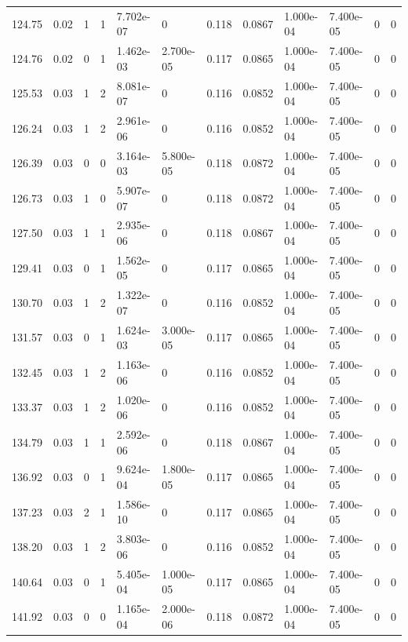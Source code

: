 \documentclass[preview]{standalone}
\begin{document}
{{{{\begin{tabular}{L{1.2cm}C{1.2cm} C{0.3cm}C{0.5cm} C{1.4cm}C{1.4cm} C{1.4cm}C{1.4cm} C{1.6cm}C{1.6cm} C{1.6cm}C{1.6cm}}
  124.75  &  0.02  & 1     &  1 &  7.702e-07  & 0  &  0.118&   0.0867& 1.000e-04 & 7.400e-05   &  0 & 0  \\ 
  124.76  &  0.02  & 0     &  1 &  1.462e-03  & 2.700e-05  &  0.117&   0.0865& 1.000e-04 & 7.400e-05   &  0 & 0  \\ 
  125.53  &  0.03  & 1     &  2 &  8.081e-07  & 0  &  0.116&   0.0852& 1.000e-04 & 7.400e-05   &  0 & 0  \\ 
  126.24  &  0.03  & 1     &  2 &  2.961e-06  & 0  &  0.116&   0.0852& 1.000e-04 & 7.400e-05   &  0 & 0  \\ 
  126.39  &  0.03  & 0     &  0 &  3.164e-03  & 5.800e-05  &  0.118&   0.0872& 1.000e-04 & 7.400e-05   &  0 & 0  \\ 
  126.73  &  0.03  & 1     &  0 &  5.907e-07  & 0  &  0.118&   0.0872& 1.000e-04 & 7.400e-05   &  0 & 0  \\ 
  127.50  &  0.03  & 1     &  1 &  2.935e-06  & 0  &  0.118&   0.0867& 1.000e-04 & 7.400e-05   &  0 & 0  \\ 
  129.41  &  0.03  & 0     &  1 &  1.562e-05  & 0  &  0.117&   0.0865& 1.000e-04 & 7.400e-05   &  0 & 0  \\ 
  130.70  &  0.03  & 1     &  2 &  1.322e-07  & 0  &  0.116&   0.0852& 1.000e-04 & 7.400e-05   &  0 & 0  \\ 
  131.57  &  0.03  & 0     &  1 &  1.624e-03  & 3.000e-05  &  0.117&   0.0865& 1.000e-04 & 7.400e-05   &  0 & 0  \\ 
  132.45  &  0.03  & 1     &  2 &  1.163e-06  & 0  &  0.116&   0.0852& 1.000e-04 & 7.400e-05   &  0 & 0  \\ 
  133.37  &  0.03  & 1     &  2 &  1.020e-06  & 0  &  0.116&   0.0852& 1.000e-04 & 7.400e-05   &  0 & 0  \\ 
  134.79  &  0.03  & 1     &  1 &  2.592e-06  & 0  &  0.118&   0.0867& 1.000e-04 & 7.400e-05   &  0 & 0  \\ 
  136.92  &  0.03  & 0     &  1 &  9.624e-04  & 1.800e-05  &  0.117&   0.0865& 1.000e-04 & 7.400e-05   &  0 & 0  \\ 
  137.23  &  0.03  & 2     &  1 &  1.586e-10  & 0  &  0.117&   0.0865& 1.000e-04 & 7.400e-05   &  0 & 0  \\ 
  138.20  &  0.03  & 1     &  2 &  3.803e-06  & 0  &  0.116&   0.0852& 1.000e-04 & 7.400e-05   &  0 & 0  \\ 
  140.64  &  0.03  & 0     &  1 &  5.405e-04  & 1.000e-05  &  0.117&   0.0865& 1.000e-04 & 7.400e-05   &  0 & 0  \\ 
  141.92  &  0.03  & 0     &  0 &  1.165e-04  & 2.000e-06  &  0.118&   0.0872& 1.000e-04 & 7.400e-05   &  0 & 0  \\ 

\end{tabular}}}}}
\end{document}
